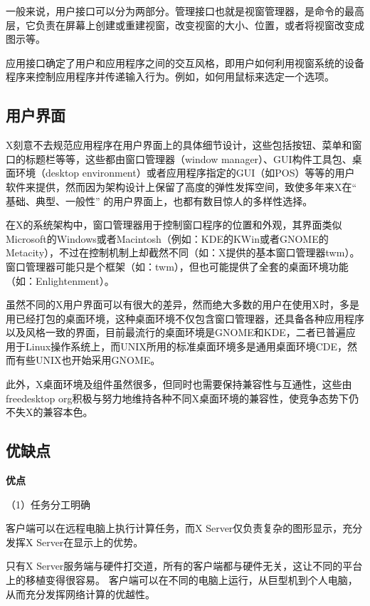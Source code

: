 \documentclass[doctor,openright,twoside]{sjtuthesis}
\theoremstyle{plain}
\theoremstyle{definition}
\theoremstyle{remark}
\theoremstyle{ocrenumbox}
\theoremstyle{plain}
\begin{document}
一般来说，用户接口可以分为两部分。管理接口也就是视窗管理器，是命令的最高层，它负责在屏幕上创建或重建视窗，改变视窗的大小、位置，或者将视窗改变成图示等。

应用接口确定了用户和应用程序之间的交互风格，即用户如何利用视窗系统的设备程序来控制应用程序并传递输入行为。例如，如何用鼠标来选定一个选项。

\hypertarget{section-10}{%
\subsection{用户界面}\label{section-10}}

X刻意不去规范应用程序在用户界面上的具体细节设计，这些包括按钮、菜单和窗口的标题栏等等，这些都由窗口管理器（window manager）、GUI构件工具包、桌面环境（desktop environment）或者应用程序指定的GUI（如POS）等等的用户软件来提供，然而因为架构设计上保留了高度的弹性发挥空间，致使多年来X在`` 基础、典型、一般性'' 的用户界面上，也都有数目惊人的多样性选择。

在X的系统架构中，窗口管理器用于控制窗口程序的位置和外观，其界面类似Microsoft的Windows或者Macintosh（例如：KDE的KWin或者GNOME的Metacity），不过在控制机制上却截然不同（如：X提供的基本窗口管理器twm）。窗口管理器可能只是个框架（如：twm），但也可能提供了全套的桌面环境功能（如：Enlightenment）。

虽然不同的X用户界面可以有很大的差异，然而绝大多数的用户在使用X时，多是用已经打包的桌面环境，这种桌面环境不仅包含窗口管理器，还具备各种应用程序以及风格一致的界面，目前最流行的桌面环境是GNOME和KDE，二者已普遍应用于Linux操作系统上，而UNIX所用的标准桌面环境多是通用桌面环境CDE，然而有些UNIX也开始采用GNOME。

此外，X桌面环境及组件虽然很多，但同时也需要保持兼容性与互通性，这些由freedesktop org积极与努力地维持各种不同X桌面环境的兼容性，使竞争态势下仍不失X的兼容本色。

\hypertarget{section-11}{%
\subsection{优缺点}\label{section-11}}

\textbf{优点}

（1）任务分工明确

客户端可以在远程电脑上执行计算任务，而X Server仅负责复杂的图形显示，充分发挥X Server在显示上的优势。

只有X Server服务端与硬件打交道，所有的客户端都与硬件无关，这让不同的平台上的移植变得很容易。
客户端可以在不同的电脑上运行，从巨型机到个人电脑，从而充分发挥网络计算的优越性。
\end{document}
